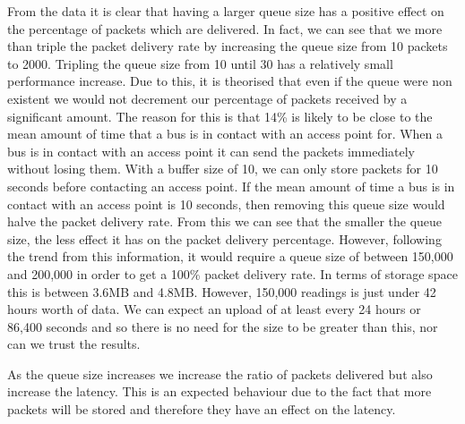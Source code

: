         From the data it is clear that having a larger queue size has a positive effect on the percentage of packets which are delivered. In fact, we can see that we more than triple the packet delivery rate by increasing the queue size from 10 packets to 2000. Tripling the queue size from 10 until 30 has a relatively small performance increase. Due to this, it is theorised that even if the queue were non existent we would not decrement our percentage of packets received by a significant amount. The reason for this is that 14\% is likely to be close to the mean amount of time that a bus is in contact with an access point for. When a bus is in contact with an access point it can send the packets immediately without losing them. With a buffer size of 10, we can only store packets for 10 seconds before contacting an access point. If the mean amount of time a bus is in contact with an access point is 10 seconds, then removing this queue size would halve the packet delivery rate. From this we can see that the smaller the queue size, the less effect it has on the packet delivery percentage. However, following the trend from this information, it would require a queue size of between 150,000 and 200,000 in order to get a 100\% packet delivery rate. In terms of storage space this is between 3.6MB and 4.8MB. However, 150,000 readings is just under 42 hours worth of data. We can expect an upload of at least every 24 hours or 86,400 seconds and so there is no need for the size to be greater than this, nor can we trust the results. 

        As the queue size increases we increase the ratio of packets delivered but also increase the latency. This is an expected behaviour due to the fact that more packets will be stored and therefore they have an effect on the latency. 

